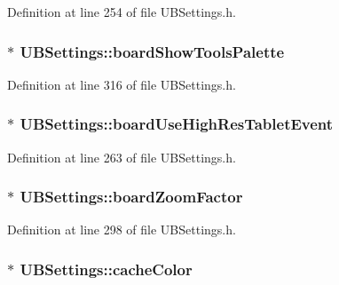 Definition at line 254 of file U\-B\-Settings.\-h.

\hypertarget{class_u_b_settings_ae51b478ae881449a3a9079ca34a41379}{
\subsubsection[{board\-Show\-Tools\-Palette}]{$\ast$ U\-B\-Settings\-::board\-Show\-Tools\-Palette}}\label{db/d66/class_u_b_settings_ae51b478ae881449a3a9079ca34a41379}


Definition at line 316 of file U\-B\-Settings.\-h.

\hypertarget{class_u_b_settings_a26882941f5a5ba68576e09f815b1b6a6}{
\subsubsection[{board\-Use\-High\-Res\-Tablet\-Event}]{$\ast$ U\-B\-Settings\-::board\-Use\-High\-Res\-Tablet\-Event}}\label{db/d66/class_u_b_settings_a26882941f5a5ba68576e09f815b1b6a6}


Definition at line 263 of file U\-B\-Settings.\-h.

\hypertarget{class_u_b_settings_af8854a651e7804e91c962491b98a9dd7}{
\subsubsection[{board\-Zoom\-Factor}]{$\ast$ U\-B\-Settings\-::board\-Zoom\-Factor}}\label{db/d66/class_u_b_settings_af8854a651e7804e91c962491b98a9dd7}


Definition at line 298 of file U\-B\-Settings.\-h.

\hypertarget{class_u_b_settings_ac08df540708d2636d25fed0bf04c8392}{
\subsubsection[{cache\-Color}]{$\ast$ U\-B\-Settings\-::cache\-Color}}\label{db/d66/class_u_b_settings_ac08df540708d2636d25fed0bf04c8392}


